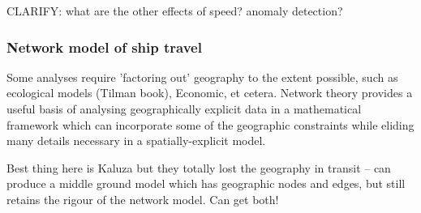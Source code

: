 CLARIFY: what are the other effects of speed? anomaly detection?

\subsubsection{Network model of ship travel}

Some analyses require 'factoring out' geography to the extent possible, such as ecological models (Tilman book), Economic, et cetera. Network theory provides a useful basis of analysing geographically explicit data in a mathematical framework which can incorporate some of the geographic constraints while eliding many details necessary in a spatially-explicit model.

Best thing here is Kaluza but they totally lost the geography in transit -- can produce a middle ground model which has geographic nodes and edges, but still retains the rigour of the network model. Can get both!









